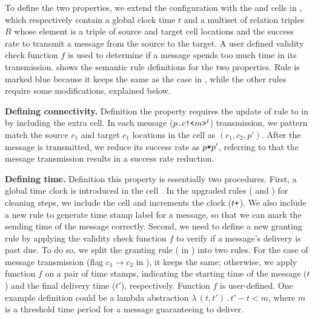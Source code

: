 To define the two properties, we extend the configuration with the  and  cells in ,
which respectively contain a global clock time $t$ and a multiset of relation triples $R$ whose element is a triple of source and target cell locations and the success rate to transmit a message from the source to the target.
A user defined validity check function $f$ is used to determine if a message spends too much time in its transmission.
 shows the semantic rule definitions for the two properties. Rule  is marked blue because it keeps the same as the case in , while the other rules require some modifications, explained below.
 
\noindent\textbf{Defining connectivity.}
Definition the property requires the update of rule  to  in 
by including the extra  cell.
In each message ($p\texttt{.}c\texttt{!<}m\texttt{>}^t$) transmission, we pattern match the source $c_1$ and target $c_1$ locations in the  cell as $(c_1,c_2,p')$. After the message is transmitted, we reduce its success rate as $p\texttt{*}p'$, referring to that the message transmission results in a success rate reduction.

\noindent\textbf{Defining time.}
Definition this property is essentially two procedures.
First, a global time clock is introduced in the cell .
In the upgraded rules ( and ) for cleaning steps, we include the  cell and increments the clock ($t\texttt{+}$). We also include a new rule  to generate time stamp label for a message, so that we can mark the sending time of the message correctly. Second, we need to define a new granting rule by applying the validity check function $f$ to verify if a message's delivery is past due. To do so, we split the granting rule ( in ) into two rules.
For the case of message transmission (flag $c_1 \rightarrow c_2$ in ), it keeps the same;
otherwise, we apply function $f$ on a pair of time stamps, indicating the starting time of the message ($t$) and the final delivery time ($t'$), respectively. Function $f$ is user-defined. One example definition could be a lambda abstraction $\lambda\,(t,t')\,.\,t'-t<m$, where $m$ is a threshold time period for a message guaranteeing to deliver.


